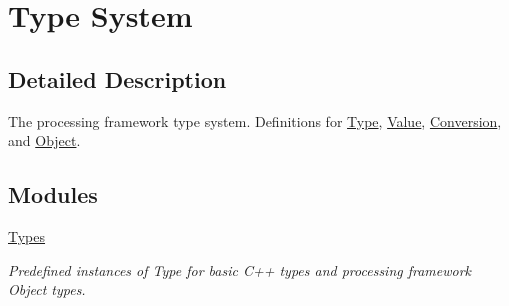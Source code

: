 \hypertarget{group___process_type}{}\section{Type System}
\label{group___process_type}


\subsection{Detailed Description}
The processing framework type system. Definitions for \hyperlink{classdg_1_1deepcore_1_1_type}{Type}, \hyperlink{classdg_1_1deepcore_1_1_value}{Value}, \hyperlink{classdg_1_1deepcore_1_1_conversion}{Conversion}, and \hyperlink{classdg_1_1deepcore_1_1_object}{Object}. 

\subsection*{Modules}
\begin{DoxyCompactItemize}
\item 
\hyperlink{group___process_types}{Types}
\begin{DoxyCompactList}\small\item\em Predefined instances of Type for basic C++ types and processing framework Object types. \end{DoxyCompactList}\end{DoxyCompactItemize}
